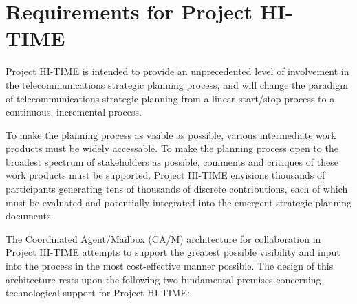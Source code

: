 \vfill
\newpage

\section{Requirements for Project HI-TIME}

Project HI-TIME is intended to provide an unprecedented level of
involvement in the telecommunications strategic planning process, and will
change the paradigm of telecommunications strategic planning from a linear
start/stop process to a continuous, incremental process.

To make the planning process as visible as possible, various intermediate
work products must be widely accessable. To make the planning process
open to the broadest spectrum of stakeholders as possible, comments and critiques of
these work products must be supported.  Project HI-TIME envisions thousands of
participants generating tens of thousands of discrete contributions, each
of which must be evaluated and potentially integrated into the emergent
strategic planning documents.

The Coordinated Agent/Mailbox (CA/M) architecture for collaboration in
Project HI-TIME attempts to support the greatest possible visibility and
input into the process in the most cost-effective manner possible.  The
design of this architecture rests upon the following two fundamental
premises concerning technological support for Project HI-TIME:

